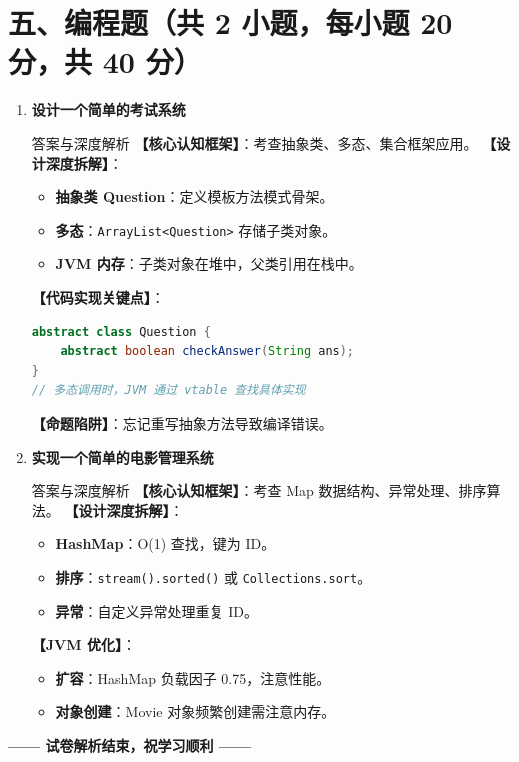 ﻿\documentclass[12pt, a4paper]{ctexart}
\newcommand{\code}[1]{\texttt{#1}}
\begin{document}
\newpage
\section{五、编程题（共 2 小题，每小题 20 分，共 40 分）}

\begin{enumerate}[label=\arabic*., itemsep=1.5em]
	\item \textbf{设计一个简单的考试系统}
	      \begin{bluebox}{答案与深度解析}
		      \textbf{【核心认知框架】}：考查抽象类、多态、集合框架应用。
		      \textbf{【设计深度拆解】}：
		      \begin{itemize}[leftmargin=*, nosep]
			      \item \textbf{抽象类 Question}：定义模板方法模式骨架。
			      \item \textbf{多态}：\code{ArrayList<Question>} 存储子类对象。
			      \item \textbf{JVM 内存}：子类对象在堆中，父类引用在栈中。
		      \end{itemize}
		      \textbf{【代码实现关键点】}：
		      \begin{lstlisting}[language=Java]
abstract class Question {
    abstract boolean checkAnswer(String ans);
}
// 多态调用时，JVM 通过 vtable 查找具体实现
        \end{lstlisting}
		      \textbf{【命题陷阱】}：忘记重写抽象方法导致编译错误。
	      \end{bluebox}

	\item \textbf{实现一个简单的电影管理系统}
	      \begin{bluebox}{答案与深度解析}
		      \textbf{【核心认知框架】}：考查 Map 数据结构、异常处理、排序算法。
		      \textbf{【设计深度拆解】}：
		      \begin{itemize}[leftmargin=*, nosep]
			      \item \textbf{HashMap}：O(1) 查找，键为 ID。
			      \item \textbf{排序}：\code{stream().sorted()} 或 \code{Collections.sort}。
			      \item \textbf{异常}：自定义异常处理重复 ID。
		      \end{itemize}
		      \textbf{【JVM 优化】}：
		      \begin{itemize}[leftmargin=*, nosep]
			      \item \textbf{扩容}：HashMap 负载因子 0.75，注意性能。
			      \item \textbf{对象创建}：Movie 对象频繁创建需注意内存。
		      \end{itemize}
	      \end{bluebox}
\end{enumerate}

\begin{center}
	\vspace{2em}
	\textbf{\Large —— 试卷解析结束，祝学习顺利 ——}
\end{center}
\end{document}
